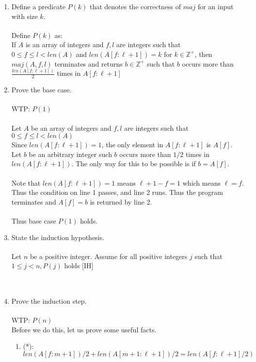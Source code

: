 \documentclass{article}
\begin{document}
\begin{enumerate}
\begin{enumerate}

\begin{enumerate}
\item Define a predicate $P(k)$ that denotes the correctness of $maj$ for an input with size $k$.\\\\
Define $P(k)$ as:\\
If $A$ is an array of integers and $f, l$ are integers such that $0\le f \le l < len(A)$ and $len(A[f:\ell +1]) = k$ for $k \in \mathbb{{Z}^{+}}$, then $maj(A, f, l)$ terminates and returns $b \in \mathbb{{Z}^{+}}$ such that $b$ occurs more than $\frac{len(A[f:\ell +1])}{2}$ times in $A[f:\ell +1]$
\item Prove the base case.\\\\
WTP: $P(1)$\\\\
Let $A$ be an array of integers and $f, l$ are integers such that $0\le f \le l < len(A)$\\
Since $len(A[f:\ell + 1]) = 1$, the only element in $A[f:\ell +1]$ is $A[f]$.
Let $b$ be an arbitrary integer such $b$ occurs more than $1/2$ times in  $len(A[f:\ell + 1])$. The only way for this to be possible is if $b = A[f]$.\\\\
Note that $len(A[f:\ell + 1]) = 1$ means  $\ell + 1 -f = 1$ which means $\ell = f$.
Thus the condition on line 1 passes, and line 2 runs. Thus the program terminates and $A[f] = b$ is returned by line 2.\\\\
Thus base case $P(1)$ holds.
\item State the induction hypothesis.\\\\
Let $n$ be a positive integer. Assume for all positive integers $j$ such that $1 \leq j < n,P(j)$ holds [IH]\\\\\\

\item Prove the induction step.\\\\
WTP: $P(n)$\\
Before we do this, let us prove some useful facts.
\quad\begin{enumerate}
	\item[](*): $len(A[f:m+1])/2 + len(A[m+1:\ell + 1])/2 = len(A[f:\ell + 1]/2)$\\
	

\end{enumerate}
\end{enumerate}
\end{enumerate}
\end{enumerate}
\end{document}
